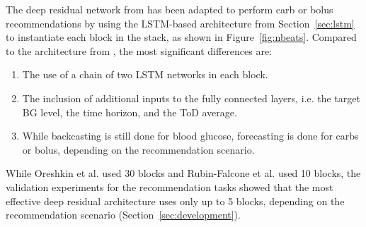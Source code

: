 The deep residual network from \cite{rubin_falcone:nbeats_bgl} has been adapted to perform carb or bolus recommendations by using the \ac{LSTM}-based architecture from Section~\ref{sec:lstm} to instantiate each block in the stack, as shown in Figure~\ref{fig:nbeats}. Compared to the architecture from \cite{rubin_falcone:nbeats_bgl}, the most significant differences are:
\begin{enumerate}
    \item The use of a chain of two \ac{LSTM} networks in each block.
    \item The inclusion of additional inputs to the fully connected layers, i.e. the target \ac{BG} level, the time horizon, and the \ac{ToD} average.
    \item While backcasting is still done for blood glucose, forecasting is done for carbs or bolus, depending on the recommendation scenario.
\end{enumerate}
While Oreshkin et al. \cite{oreshkin:nbeats} used 30 blocks and Rubin-Falcone et al. \cite{rubin_falcone:nbeats_bgl} used 10 blocks, the validation experiments for the recommendation tasks showed that the most effective deep residual architecture uses only up to 5 blocks, depending on the recommendation scenario (Section~\ref{sec:development}).